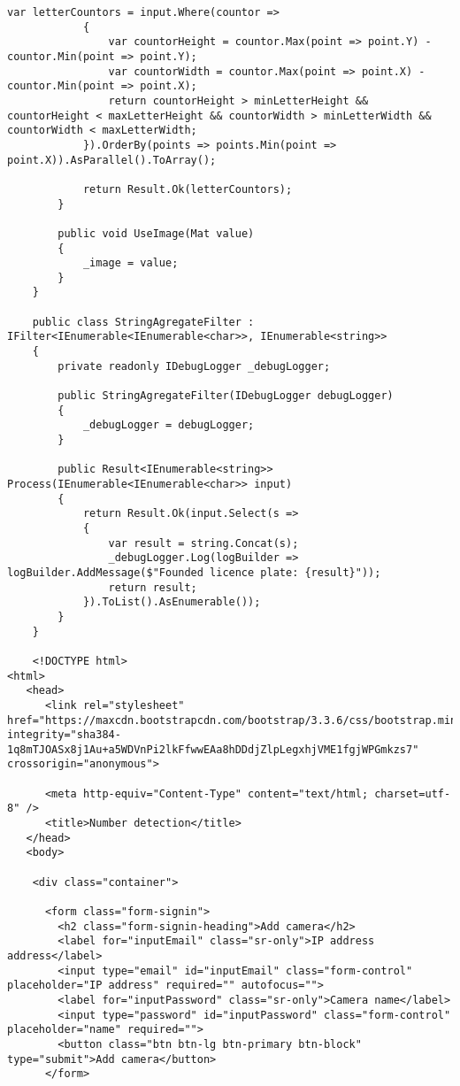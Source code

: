 \begin{lstlisting}[style=fsharpstyle,caption={Исходный код}, label=lst:recognition_result_handler]
            var letterCountors = input.Where(countor =>
            {
                var countorHeight = countor.Max(point => point.Y) - countor.Min(point => point.Y);
                var countorWidth = countor.Max(point => point.X) - countor.Min(point => point.X);
                return countorHeight > minLetterHeight && countorHeight < maxLetterHeight && countorWidth > minLetterWidth && countorWidth < maxLetterWidth;
            }).OrderBy(points => points.Min(point => point.X)).AsParallel().ToArray();

            return Result.Ok(letterCountors);
        }

        public void UseImage(Mat value)
        {
            _image = value;
        }
    }

    public class StringAgregateFilter : IFilter<IEnumerable<IEnumerable<char>>, IEnumerable<string>>
    {
        private readonly IDebugLogger _debugLogger;

        public StringAgregateFilter(IDebugLogger debugLogger)
        {
            _debugLogger = debugLogger;
        }

        public Result<IEnumerable<string>> Process(IEnumerable<IEnumerable<char>> input)
        {
            return Result.Ok(input.Select(s =>
            {
                var result = string.Concat(s);
                _debugLogger.Log(logBuilder => logBuilder.AddMessage($"Founded licence plate: {result}"));
                return result;
            }).ToList().AsEnumerable());
        }
    }

    <!DOCTYPE html>
<html>
   <head>
      <link rel="stylesheet" href="https://maxcdn.bootstrapcdn.com/bootstrap/3.3.6/css/bootstrap.min.css" integrity="sha384-1q8mTJOASx8j1Au+a5WDVnPi2lkFfwwEAa8hDDdjZlpLegxhjVME1fgjWPGmkzs7" crossorigin="anonymous">

      <meta http-equiv="Content-Type" content="text/html; charset=utf-8" />
      <title>Number detection</title>
   </head>
   <body>

    <div class="container">

      <form class="form-signin">
        <h2 class="form-signin-heading">Add camera</h2>
        <label for="inputEmail" class="sr-only">IP address address</label>
        <input type="email" id="inputEmail" class="form-control" placeholder="IP address" required="" autofocus="">
        <label for="inputPassword" class="sr-only">Camera name</label>
        <input type="password" id="inputPassword" class="form-control" placeholder="name" required="">
        <button class="btn btn-lg btn-primary btn-block" type="submit">Add camera</button>
      </form>


\end{lstlisting}
